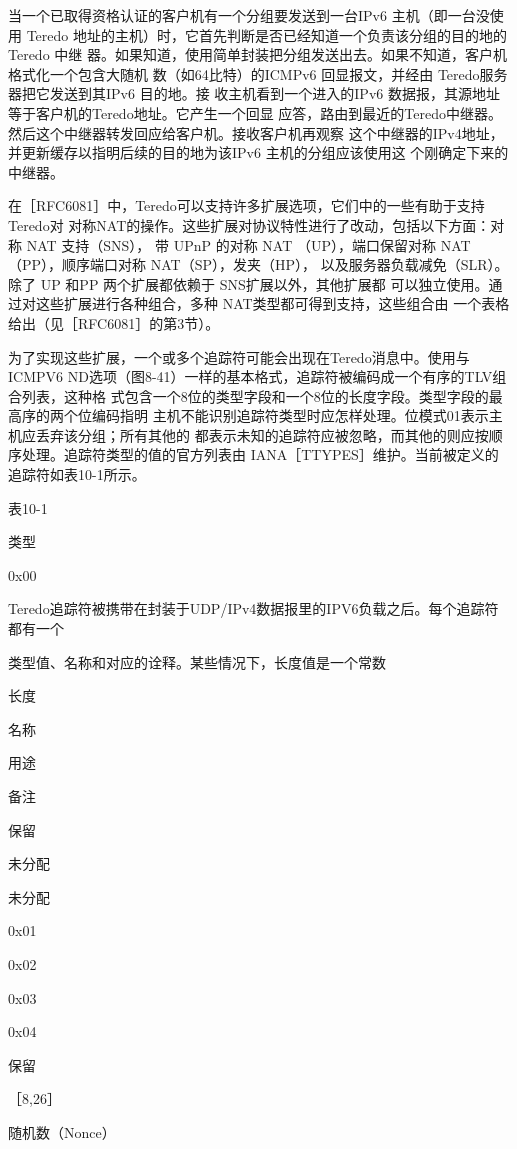 当一个已取得资格认证的客户机有一个分组要发送到一台IPv6 主机（即一台没使用
Teredo 地址的主机）时，它首先判断是否已经知道一个负责该分组的目的地的Teredo 中继
器。如果知道，使用简单封装把分组发送出去。如果不知道，客户机格式化一个包含大随机
数（如64比特）的ICMPv6 回显报文，并经由 Teredo服务器把它发送到其IPv6 目的地。接
收主机看到一个进入的IPv6 数据报，其源地址等于客户机的Teredo地址。它产生一个回显
应答，路由到最近的Teredo中继器。然后这个中继器转发回应给客户机。接收客户机再观察
这个中继器的IPv4地址，并更新缓存以指明后续的目的地为该IPv6 主机的分组应该使用这
个刚确定下来的中继器。

在［RFC6081］中，Teredo可以支持许多扩展选项，它们中的一些有助于支持 Teredo对
对称NAT的操作。这些扩展对协议特性进行了改动，包括以下方面：对称 NAT 支持（SNS），
带 UPnP 的对称 NAT （UP），端口保留对称 NAT （PP），顺序端口对称 NAT（SP），发夹（HP），
以及服务器负载减免（SLR）。除了 UP 和PP 两个扩展都依赖于 SNS扩展以外，其他扩展都
可以独立使用。通过对这些扩展进行各种组合，多种 NAT类型都可得到支持，这些组合由
一个表格给出（见［RFC6081］的第3节）。

为了实现这些扩展，一个或多个追踪符可能会出现在Teredo消息中。使用与ICMPV6
ND选项（图8-41）一样的基本格式，追踪符被编码成一个有序的TLV组合列表，这种格
式包含一个8位的类型字段和一个8位的长度字段。类型字段的最高序的两个位编码指明
主机不能识别追踪符类型时应怎样处理。位模式01表示主机应丢弃该分组；所有其他的
都表示未知的追踪符应被忽略，而其他的则应按顺序处理。追踪符类型的值的官方列表由
IANA［TTYPES］维护。当前被定义的追踪符如表10-1所示。

表10-1

类型

0x00

Teredo追踪符被携带在封装于UDP/IPv4数据报里的IPV6负载之后。每个追踪符都有一个

类型值、名称和对应的诠释。某些情况下，长度值是一个常数

长度

名称

用途

备注

保留

未分配

未分配

0x01

0x02

0x03

0x04

保留

［8,26］

随机数（Nonce）

